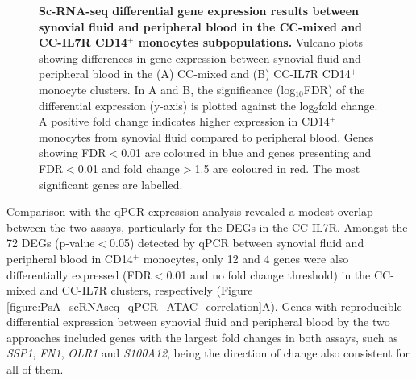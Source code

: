 \begin{figure}[H]
\begin{subfigure}[b]{0.55\textwidth}
\caption{}
\end{subfigure}
\caption[Sc-RNA-seq differential gene expression results between synovial fluid and peripheral blood in the CC-mixed and CC-IL7R CD14$^+$ monocytes subpopulations.]{\textbf{Sc-RNA-seq differential gene expression results between synovial fluid and peripheral blood in the CC-mixed and CC-IL7R CD14$^+$ monocytes subpopulations.} Vulcano plots showing differences in gene expression between synovial fluid and peripheral blood in the (A) CC-mixed and (B) CC-IL7R CD14$^+$ monocyte clusters. In A and B, the significance (log$_{10}$FDR) of the differential expression (y-axis) is plotted against the log${_2}$fold change. A positive fold change indicates higher expression in CD14$^+$ monocytes from synovial fluid compared to peripheral blood. Genes showing FDR$<$0.01 are coloured in blue and genes presenting and FDR$<$0.01 and fold change$>$1.5 are coloured in red. The most significant genes are labelled.}
\label{figure:PsA_scRNAseq_vulcano_plots_mixed_and_IL7R_clusters}
\end{figure}



Comparison with the qPCR expression analysis revealed a modest overlap between the two assays, particularly for the DEGs in the CC-IL7R. Amongst the 72 DEGs (p-value$<$0.05) detected by qPCR between synovial fluid and peripheral blood in CD14$^+$ monocytes, only 12 and 4 genes were also differentially expressed (FDR$<$0.01 and no fold change threshold) in the CC-mixed and CC-IL7R clusters, respectively (Figure \ref{figure:PsA_scRNAseq_qPCR_ATAC_correlation}A). Genes with reproducible differential expression between synovial fluid and peripheral blood by the two approaches included genes with the largest fold changes in both assays, such as \textit{SSP1}, \textit{FN1}, \textit{OLR1} and \textit{S100A12}, being the direction of change also consistent for all of them. %
   
